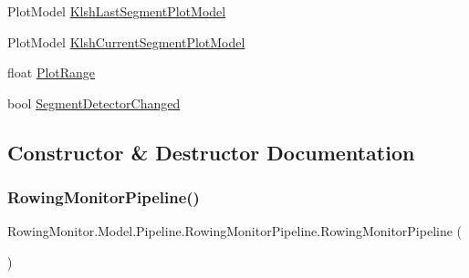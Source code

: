 \begin{DoxyCompactItemize}
\item 
Plot\+Model \hyperlink{class_rowing_monitor_1_1_model_1_1_pipeline_1_1_rowing_monitor_pipeline_a1ec7023f64fc4b08d54122a2a1f8c975}{Klsh\+Last\+Segment\+Plot\+Model}
\item 
Plot\+Model \hyperlink{class_rowing_monitor_1_1_model_1_1_pipeline_1_1_rowing_monitor_pipeline_aa103ae2c7cff43766d4504d65f7b08c8}{Klsh\+Current\+Segment\+Plot\+Model}
\item 
float \hyperlink{class_rowing_monitor_1_1_model_1_1_pipeline_1_1_rowing_monitor_pipeline_a8785331b7998495eb3ff8b2d954197e6}{Plot\+Range}
\item 
bool \hyperlink{class_rowing_monitor_1_1_model_1_1_pipeline_1_1_rowing_monitor_pipeline_a1a9b18e25cc5a89dde6be14a07b8f2b6}{Segment\+Detector\+Changed}
\end{DoxyCompactItemize}


\subsection{Constructor \& Destructor Documentation}
\mbox{\label{class_rowing_monitor_1_1_model_1_1_pipeline_1_1_rowing_monitor_pipeline_ae4e9b2608fbff1b0d6c368fab6c57d27}} 
\subsubsection{\texorpdfstring{Rowing\+Monitor\+Pipeline()}{RowingMonitorPipeline()}}
{\footnotesize\ttfamily Rowing\+Monitor.\+Model.\+Pipeline.\+Rowing\+Monitor\+Pipeline.\+Rowing\+Monitor\+Pipeline (\begin{DoxyParamCaption}{ }\end{DoxyParamCaption})}



